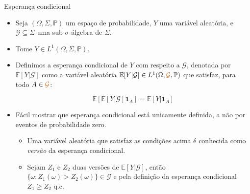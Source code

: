 \documentclass[11pt]{beamer}
\begin{document}
	\begin{frame}{Esperança condicional}
	\begin{itemize}
		\item Seja $(\Omega, \Sigma,\mathbb{P})$ um espaço de probabilidade, $Y$ uma variável aleatória, e $\mathcal{G}\subseteq \Sigma$ uma sub-$\sigma$-álgebra de $\Sigma$.
		\item Tome $Y \in L^1(\Omega, \Sigma,\mathbb{P})$.
		\item Definimos a esperança condicional de $Y$ com respeito a $\mathcal{G}$, denotada por $\mathbb{E}[Y|\mathcal{G}]$ como a {\color{blue}variável aleatória} $\mathbb{E}[Y|\mathcal{G}] \in L^1(\Omega, {\color{red}\mathcal{G}},\mathbb{P})$  que satisfaz, para todo $A \in {\color{red}\mathcal{G}}$:
		
		$$\mathbb{E}[\mathbb{E}[Y|\mathcal{G}]\mathbf{1}_A] = \mathbb{E}[Y|\mathbf{1}_A]$$
		\item Fácil mostrar que esperança condicional está unicamente definida, a não por eventos de probabilidade zero.
		\begin{itemize}
			\item Uma variável aleatória que satisfaz as condições acima é conhecida como \emph{versão} da esperança condicional.
			\item Sejam $Z_1$ e $Z_2$ duas versões de $\mathbb{E}[Y|\mathcal{G}]$, então $\{\omega: Z_1(\omega)>Z_2(\omega)\} \in \mathcal{G}$ e pela definição da esperança condicional $Z_1\geq Z_2$ q.c.
		\end{itemize}
	\end{itemize}
	\end{frame}
\end{document}
